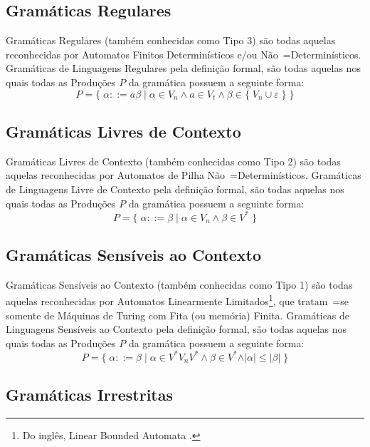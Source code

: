 {\subsection{Gramáticas Regulares}

    Gramáticas Regulares (também conhecidas como Tipo 3) são todas aquelas reconhecidas por Automatos Finitos Determinísticos e\slash{}ou Não~=Determinísticos.
    Gramáticas de Linguagens Regulares pela definição formal,
    são todas aquelas nos quais todas as Produções $P$ da gramática possuem a seguinte forma:
    $$ P = \{\; \alpha ::= a \beta \;|\; \alpha \in V_n \land a \in V_t
                \land \beta \in \{\; V_n \cup \varepsilon\; \} \;\} $$

\subsection{Gramáticas Livres de Contexto}

    Gramáticas Livres de Contexto (também conhecidas como Tipo 2) \cite{hopcroftBook} são todas aquelas reconhecidas por Automatos de Pilha Não~=Determinísticos.
    Gramáticas de Linguagens Livre de Contexto pela definição formal,
    são todas aquelas nos quais todas as Produções $P$ da gramática possuem a seguinte forma:
    $$ P = \{\; \alpha ::= \beta \;|\; \alpha \in V_n \land \beta \in V^* \;\} $$


\subsection{Gramáticas Sensíveis ao Contexto}

    Gramáticas Sensíveis ao Contexto (também conhecidas como Tipo 1) são todas aquelas reconhecidas por Automatos Linearmente Limitados\footnote{
    Do inglês,
    Linear Bounded Automata \cite{fundamentalsOfTheoreticalComputerScience}.
    },
    que tratam~=se somente de Máquinas de Turing \cite{sipserBook} com Fita (ou memória) Finita.
    Gramáticas de Linguagens Sensíveis ao Contexto pela definição formal,
    são todas aquelas nos quais todas as Produções $P$ da gramática possuem a seguinte forma:
    $$ P = \{\; \alpha ::= \beta \;|\; \alpha \in V^* V_n V^* \land \beta \in V^*
                \land \vert\alpha\vert \leq \vert\beta\vert \;\} $$


\subsection{Gramáticas Irrestritas}

}
